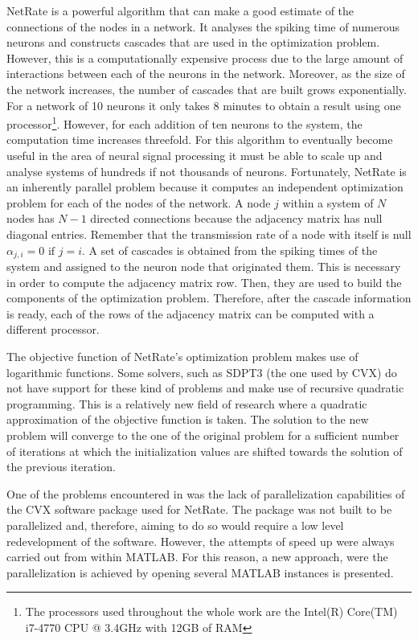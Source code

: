 \documentclass[11pt]{article}
\begin{document}
NetRate is a powerful algorithm that can make a good estimate of the connections of the nodes in a network. It analyses the spiking time of numerous neurons and constructs cascades that are used in the optimization problem. However, this is a computationally expensive process due to the large amount of interactions between each of the neurons in the network. Moreover, as the size of the network increases, the number of cascades that are built grows exponentially. For a network of 10 neurons it only takes 8 minutes to obtain a result using one processor\footnote{The processors used throughout the whole work are the Intel(R) Core(TM) i7-4770 CPU @ 3.4GHz with 12GB of RAM}. However, for each addition of ten neurons to the system, the computation time increases threefold. 
For this algorithm to eventually become useful in the area of neural signal processing it must be able to scale up and analyse systems of hundreds if not thousands of neurons. Fortunately, NetRate is an inherently parallel problem because it computes an independent optimization problem for each of the nodes of the network. A node \(j\) within a system of \(N\) nodes has \(N-1\) directed connections because the adjacency matrix has null diagonal entries. Remember that the transmission rate of a node with itself is null \(\alpha_{j,i} = 0 \text{ if } j=i\).  
A set of cascades is obtained from the spiking times of the system and assigned to the neuron node that originated them. This is necessary in order to compute the adjacency matrix row. Then, they are used to build the components of the optimization problem. Therefore, after the cascade information is ready, each of the rows of the adjacency matrix can be computed with a different processor.

The objective function of NetRate's optimization problem makes use of logarithmic functions. Some solvers, such as SDPT3 \cite{toh1999sdpt3,tutuncu2003solving} (the one used by CVX) do not have support for these kind of problems and make use of recursive quadratic programming. This is a relatively new field of research \cite{powell1986recursive} where a quadratic approximation of the objective function is taken. The solution to the new problem will converge to the one of the original problem for a sufficient number of iterations at which the initialization values are shifted towards the solution of the previous iteration.

One of the problems encountered in \cite{pranav_report} was the lack of parallelization capabilities of the CVX software package used for NetRate. The package was not built to be parallelized and, therefore, aiming to do so would require a low level redevelopment of the software. However, the attempts of speed up were always carried out from within MATLAB. For this reason, a new approach, were the parallelization is achieved by opening several MATLAB instances is presented. 
\end{document}
